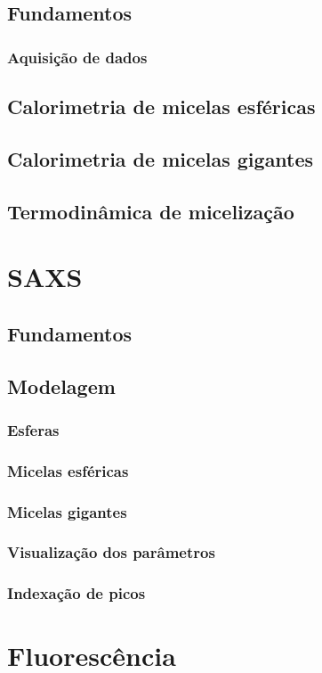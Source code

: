 		\section{Fundamentos}
			\subsection{Aquisição de dados}
		\section{Calorimetria de micelas esféricas}
		\section{Calorimetria de micelas gigantes}
		\section{Termodinâmica de micelização}
	\chapter{SAXS}
		\section{Fundamentos}
		\section{Modelagem}
			\subsection{Esferas}
			\subsection{Micelas esféricas}
			\subsection{Micelas gigantes}
			\subsection{Visualização dos parâmetros}
			\subsection{Indexação de picos}
	\chapter{Fluorescência}
